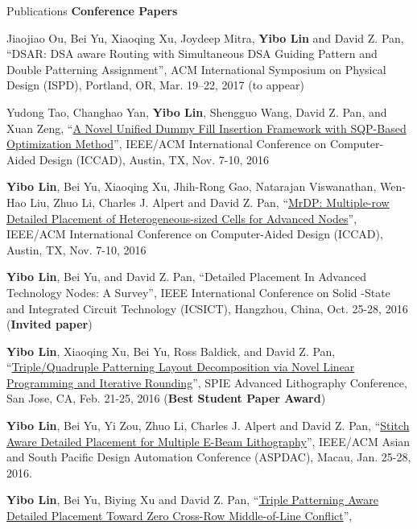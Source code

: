 \begin{rSection}{Publications}
\textbf{Conference Papers}
\begin{description}[font=\normalfont]
\item[{[C9]}]{
    Jiaojiao Ou, Bei Yu, Xiaoqing Xu, Joydeep Mitra, \textbf{Yibo Lin} and David Z. Pan, 
    ``DSAR: DSA aware Routing with Simultaneous DSA Guiding Pattern and Double Patterning Assignment'', 
    ACM International Symposium on Physical Design (ISPD), Portland, OR, Mar. 19–22, 2017
    (to appear)
}
\item[{[C8]}]{
    Yudong Tao, Changhao Yan, \textbf{Yibo Lin}, Shengguo Wang, David Z. Pan, and Xuan Zeng, 
    ``\href{http://dx.doi.org/10.1145/2966986.2966994}{A Novel Unified Dummy Fill Insertion Framework with SQP-Based Optimization Method}'', 
    IEEE/ACM International Conference on Computer-Aided Design (ICCAD), Austin, TX, Nov. 7-10, 2016
}
\item[{[C7]}]{
    \textbf{Yibo Lin}, Bei Yu, Xiaoqing Xu, Jhih-Rong Gao, Natarajan Viswanathan, Wen-Hao Liu, Zhuo Li, Charles J. Alpert and David Z. Pan, 
    ``\href{http://dx.doi.org/10.1145/2966986.2967055}{MrDP: Multiple-row Detailed Placement of Heterogeneous-sized Cells for Advanced Nodes}'', 
    IEEE/ACM International Conference on Computer-Aided Design (ICCAD), Austin, TX, Nov. 7-10, 2016
}
\item[{[C6]}]{
    \textbf{Yibo Lin}, Bei Yu, and David Z. Pan, 
   ``Detailed Placement In Advanced Technology Nodes: A Survey'', 
   IEEE International Conference on Solid -State and Integrated Circuit Technology (ICSICT), Hangzhou, China, Oct. 25-28, 2016
   (\textbf{Invited paper})
}
\item[{[C5]}]{
    \textbf{Yibo Lin}, Xiaoqing Xu, Bei Yu, Ross Baldick, and David Z. Pan, 
 ``\href{proceedings.spiedigitallibrary.org/proceeding.aspx?articleid=2505329}{Triple/Quadruple Patterning Layout Decomposition via Novel Linear Programming and Iterative Rounding}'', 
    SPIE Advanced Lithography Conference, San Jose, CA, Feb. 21-25, 2016
    (\textbf{Best Student Paper Award})
}
\item[{[C4]}]{
 \textbf{Yibo Lin}, Bei Yu, Yi Zou, Zhuo Li, Charles J. Alpert and David Z. Pan, 
 ``\href{http://ieeexplore.ieee.org/xpl/articleDetails.jsp?arnumber=7428009}{Stitch Aware Detailed Placement for Multiple E-Beam Lithography}'', 
    IEEE/ACM Asian and South Pacific Design Automation Conference (ASPDAC), Macau, Jan. 25-28, 2016.
}
\item[{[C3]}]{
 \textbf{Yibo Lin}, Bei Yu, Biying Xu and David Z. Pan, 
 ``\href{http://dl.acm.org/citation.cfm?id=2840875}{Triple Patterning Aware Detailed Placement Toward Zero Cross-Row Middle-of-Line Conflict}'', 
}
\end{description}
\end{rSection}

